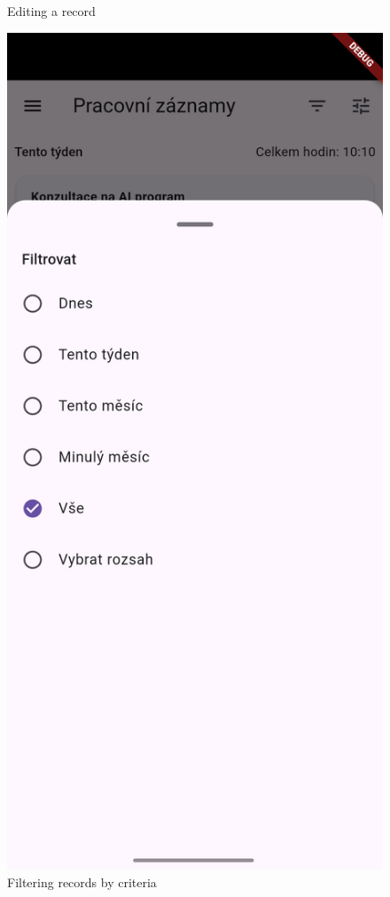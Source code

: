 \documentclass[
  digital,     %
  oneside,     %
  nosansbold,  %
  nocolorbold, %
  lof,         %
  lot,         %
]{fithesis4}
\begin{document}
\begin{center}
\begin{minipage}{0.45\textwidth}
\begin{figure}[H]
    \caption{Editing a record}
    \label{fig:edit_record}
  \end{figure}
\end{minipage}
\hspace{0.05\textwidth}
\begin{minipage}{0.45\textwidth}
  \begin{figure}[H]
    \centering
    \includegraphics[width=\textwidth]{assets/filter_records_by.png}
    \caption{Filtering records by criteria}
    \label{fig:filter_records}
  \end{figure}
\end{minipage}
\end{center}
\end{document}

